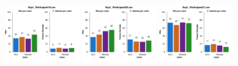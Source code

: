\begin{figure}[th]
\includegraphics[width=0.30\textwidth]{Figures/Color_Exp1_P19} \includegraphics[width=0.30\textwidth]{Figures/Color_Exp1_P20} \includegraphics[width=0.30\textwidth]{Figures/Color_Exp1_P21} 
\caption[Color_Exp1]{}
\label{fig:Color_E1}
\end{figure}

